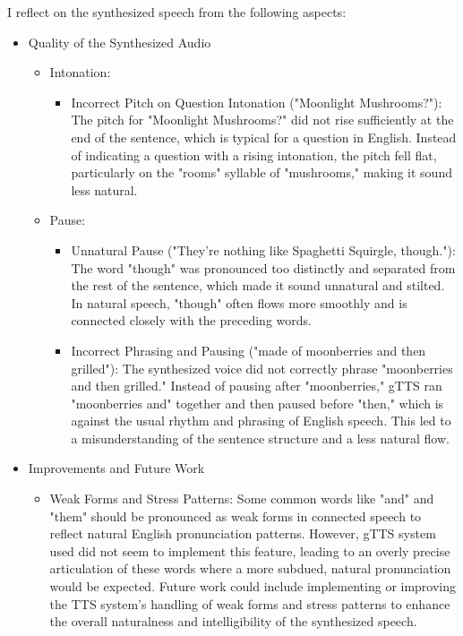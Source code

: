 \documentclass{../labbook}
\begin{document}
\begin{solution}
I reflect on the synthesized speech from the following aspects:
\begin{itemize}
  \item Quality of the Synthesized Audio
  \begin{itemize}
    \item Intonation: 
    \begin{itemize}
      \item Incorrect Pitch on Question Intonation ("Moonlight Mushrooms?"): The pitch for "Moonlight Mushrooms?" did not rise sufficiently at the end of the sentence, which is typical for a question in English. Instead of indicating a question with a rising intonation, the pitch fell flat, particularly on the "rooms" syllable of "mushrooms," making it sound less natural.
    \end{itemize}
    \item Pause:
    \begin{itemize}
      \item Unnatural Pause ("They're nothing like Spaghetti Squirgle, though."): The word "though" was pronounced too distinctly and separated from the rest of the sentence, which made it sound unnatural and stilted. In natural speech, "though" often flows more smoothly and is connected closely with the preceding words.
      \item Incorrect Phrasing and Pausing ("made of moonberries and then grilled"): The synthesized voice did not correctly phrase "moonberries and then grilled." Instead of pausing after "moonberries," gTTS ran "moonberries and" together and then paused before "then," which is against the usual rhythm and phrasing of English speech. This led to a misunderstanding of the sentence structure and a less natural flow.
    \end{itemize}
  \end{itemize}
  \item Improvements and Future Work
  \begin{itemize}
    \item Weak Forms and Stress Patterns: Some common words like "and" and "them" should be pronounced as weak forms in connected speech to reflect natural English pronunciation patterns. However, gTTS system used did not seem to implement this feature, leading to an overly precise articulation of these words where a more subdued, natural pronunciation would be expected. Future work could include implementing or improving the TTS system's handling of weak forms and stress patterns to enhance the overall naturalness and intelligibility of the synthesized speech.
  \end{itemize}
\end{itemize}
\end{solution}
\end{document}
